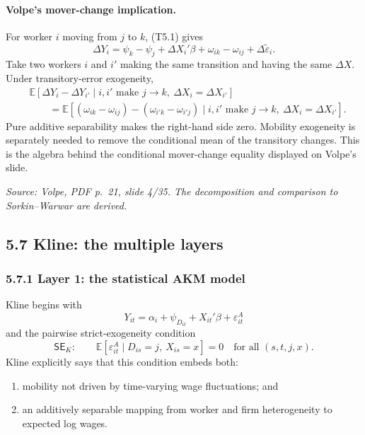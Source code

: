 \documentclass[11pt]{article}
\begin{document}
\paragraph{Volpe's mover-change implication.}
For worker \(i\) moving from \(j\) to \(k\), (T5.1) gives
\[
\Delta Y_i
=
\psi_k-\psi_j+\Delta X_i'\beta
+\omega_{ik}-\omega_{ij}
+\Delta\widetilde\varepsilon_i.
\tag{T5.21a}
\]
Take two workers \(i\) and \(i'\) making the same transition and having the
same \(\Delta X\).  Under transitory-error exogeneity,
\[
\begin{aligned}
&\mathbb E[
\Delta Y_i-\Delta Y_{i'}
\mid
i,i'\text{ make }j\to k,\ \Delta X_i=\Delta X_{i'}]\\
&\qquad =
\mathbb E[
(\omega_{ik}-\omega_{ij})
-(\omega_{i'k}-\omega_{i'j})
\mid
i,i'\text{ make }j\to k,\ \Delta X_i=\Delta X_{i'}].
\end{aligned}
\tag{T5.21b}
\]
Pure additive separability makes the right-hand side zero.  Mobility
exogeneity is separately needed to remove the conditional mean of the
transitory changes.  This is the algebra behind the conditional
mover-change equality displayed on Volpe's slide.

\textit{Source: Volpe, PDF p.\ 21, slide 4/35.  The decomposition and
comparison to Sorkin--Warwar are derived.}

\subsection{5.7 Kline: the multiple layers}

\subsubsection{5.7.1 Layer 1: the statistical AKM model}

Kline begins with
\[
Y_{it}
=
\alpha_i+\psi_{D_{it}}+X_{it}'\beta+\varepsilon^A_{it}
\tag{T5.22}
\]
and the pairwise strict-exogeneity condition
\[
\mathsf{SE}_{K}:
\qquad
\mathbb E[
\varepsilon^A_{it}
\mid
D_{is}=j,\ X_{is}=x
]
=0
\quad
\text{for all }(s,t,j,x).
\tag{T5.23}
\]
Kline explicitly says that this condition embeds both:

\begin{enumerate}
\item mobility not driven by time-varying wage fluctuations; and
\item an additively separable mapping from worker and firm heterogeneity to
  expected log wages.
\end{enumerate}
\end{document}
